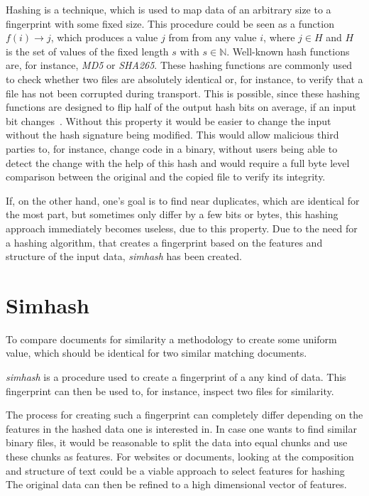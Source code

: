 \documentclass[12pt,a4paper,DIV=calc]{scrartcl}
\begin{document}
Hashing is a technique, which is used to map data of an arbitrary size to a fingerprint with some fixed size.
This procedure could be seen as a function  $f(i) \rightarrow j$, which produces a value $j$ from from any value $i$, where $j \in H$ and $H$ is the set of values of the fixed length $s$ with $s \in \mathbb{N}$.
Well-known hash functions are, for instance, \emph{MD5} or \emph{SHA265}.
These hashing functions are commonly used to check whether two files are absolutely identical or, for instance, to verify that a file has not been corrupted during transport.
This is possible, since these hashing functions are designed to flip half of the output hash bits on average, if an input bit changes~\cite{book:hashing}.
Without this property it would be easier to change the input without the hash signature being modified.
This would allow malicious third parties to, for instance, change code in a binary, without users being able to detect the change with the help of this hash and would require a full byte level comparison between the original and the copied file to verify its integrity.

If, on the other hand, one's goal is to find near duplicates, which are identical for the most part, but sometimes only differ by a few bits or bytes, this hashing approach immediately becomes useless, due to this property.
Due to the need for a hashing algorithm, that creates a fingerprint based on the features and structure of the input data, \emph{simhash} has been created.


\section{Simhash}

To compare documents for similarity a methodology to create some uniform value, which should be identical for two similar matching documents.

\emph{simhash} is a procedure used to create a fingerprint of a any kind of data.
This fingerprint can then be used to, for instance, inspect two files for similarity.

The process for creating such a fingerprint can completely differ depending on the features in the hashed data one is interested in.
In case one wants to find similar binary files, it would be reasonable to split the data into equal chunks and use these chunks as features.
For websites or documents, looking at the composition and structure of text could be a viable approach to select features for hashing
The original data can then be refined to a high dimensional vector of features.
\end{document}
